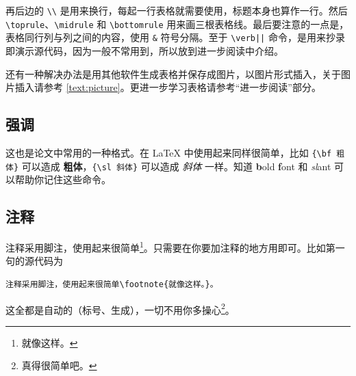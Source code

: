 再后边的 \verb|\\| 是用来换行，每起一行表格就需要使用，标题本身也算作一行。然后 \verb|\toprule|、\verb|\midrule| 和 \verb|\bottomrule| 用来画三根表格线。最后要注意的一点是，表格同行列与列之间的内容，使用 \verb|&| 符号分隔。至于 \verb+\verb||+ 命令，是用来抄录即演示源代码，因为一般不常用到，所以放到进一步阅读中介绍。

还有一种解决办法是用其他软件生成表格并保存成图片，以图片形式插入，关于图片插入请参考 \ref{text:picture}。更进一步学习表格请参考“进一步阅读”部分。

\subsection{强调}
这也是论文中常用的一种格式。在 LaTeX 中使用起来同样很简单，比如 \verb|{\bf 粗体}| 可以造成 {\bf 粗体}，\verb|{\sl 斜体}| 可以造成 {\sl 斜体} 一样。知道 {\bf b}old {\bf f}ont 和 {\sl sl}ant 可以帮助你记住这些命令。

\subsection{注释}
注释采用脚注，使用起来很简单\footnote{就像这样。}。只需要在你要加注释的地方用即可。比如第一句的源代码为
\begin{Verbatim}[frame=single]
注释采用脚注，使用起来很简单\footnote{就像这样。}。
\end{Verbatim}
这全都是自动的（标号、生成），一切不用你多操心\footnote{真得很简单吧。}。

